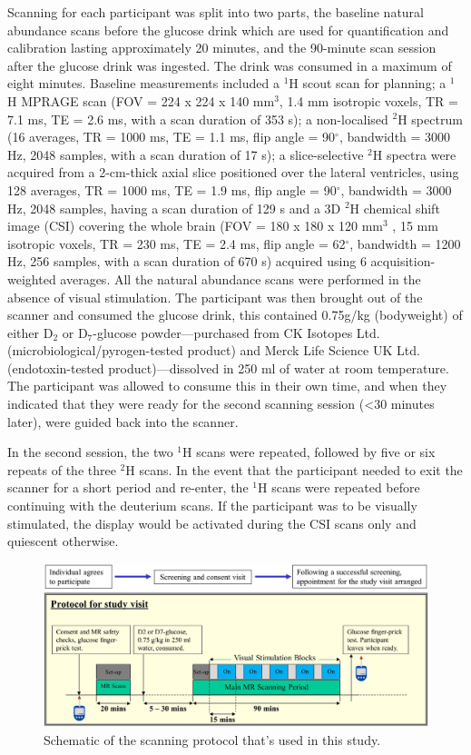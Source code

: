 \documentclass[class=article, crop=false]{standalone}
\begin{document}
Scanning for each participant was split into two parts, the baseline natural abundance scans before the glucose drink which are used for quantification and calibration lasting approximately 20 minutes, and the 90-minute scan session after the glucose drink was ingested. The drink was consumed in a maximum of eight minutes. Baseline measurements included a $^1$H scout scan for planning; a $^1$H MPRAGE scan (FOV = 224 x 224 x 140 mm$^3$, 1.4 mm isotropic voxels, TR = 7.1 ms, TE = 2.6 ms, with a scan duration of 353 s); a non-localised $^2$H spectrum (16 averages, TR = 1000 ms, TE = 1.1 ms, flip angle = 90$^\circ$, bandwidth = 3000 Hz, 2048 samples, with a scan duration of 17 s); a slice-selective $^2$H spectra were acquired from a 2-cm-thick axial slice positioned over the lateral ventricles, using 128 averages, TR = 1000 ms, TE = 1.9 ms, flip angle = 90$^\circ$, bandwidth = 3000 Hz,  2048 samples, having a scan duration of 129 s and a 3D $^2$H chemical shift image (CSI) covering the whole brain (FOV = 180 x 180 x 120 mm$^3$ , 15 mm isotropic voxels, TR = 230 ms, TE = 2.4 ms, flip angle = 62$^\circ$, bandwidth = 1200 Hz, 256 samples, with a scan duration of 670 s) acquired using 6 acquisition-weighted\cite{Pohmann2001AccurateCSI} averages. All the natural abundance scans were performed in the absence of visual stimulation. The participant was then brought out of the scanner and consumed the glucose drink, this contained 0.75g/kg (bodyweight) of either D$_2$ or D$_7$-glucose powder—purchased from CK Isotopes Ltd. (microbiological/pyrogen-tested product) and Merck Life Science UK Ltd. (endotoxin-tested product)—dissolved in 250 ml of water at room temperature. The participant was allowed to consume this in their own time, and when they indicated that they were ready for the second scanning session (<30 minutes later), were guided back into the scanner.

In the second session, the two $^1$H scans were repeated, followed by five or six repeats of the three $^2$H scans. In the event that the participant needed to exit the scanner for a short period and re-enter, the $^1$H scans were repeated before continuing with the deuterium scans. If the participant was to be visually stimulated, the display would be activated during the CSI scans only and quiescent otherwise.  

\begin{figure}
    \centering
    \includegraphics[width = 1\textwidth]{Figures/Glucose/Protocol.png}
    \caption{Schematic of the scanning protocol that's used in this study.}
    \label{fig:Glu:Protocol}
\end{figure}
\end{document}
